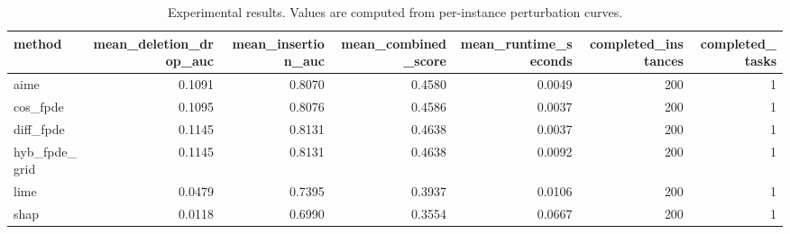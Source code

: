 \begin{table}[t]
\caption{Experimental results. Values are computed from per-instance perturbation curves.}
\label{tab:main_results_computed}
\centering
\begin{tabular}{lrrrrrr}
\toprule
method & mean\_deletion\_drop\_auc & mean\_insertion\_auc & mean\_combined\_score & mean\_runtime\_seconds & completed\_instances & completed\_tasks \\
\midrule
aime & 0.1091 & 0.8070 & 0.4580 & 0.0049 & 200 & 1 \\
cos\_fpde & 0.1095 & 0.8076 & 0.4586 & 0.0037 & 200 & 1 \\
diff\_fpde & 0.1145 & 0.8131 & 0.4638 & 0.0037 & 200 & 1 \\
hyb\_fpde\_grid & 0.1145 & 0.8131 & 0.4638 & 0.0092 & 200 & 1 \\
lime & 0.0479 & 0.7395 & 0.3937 & 0.0106 & 200 & 1 \\
shap & 0.0118 & 0.6990 & 0.3554 & 0.0667 & 200 & 1 \\
\bottomrule
\end{tabular}

\end{table}
